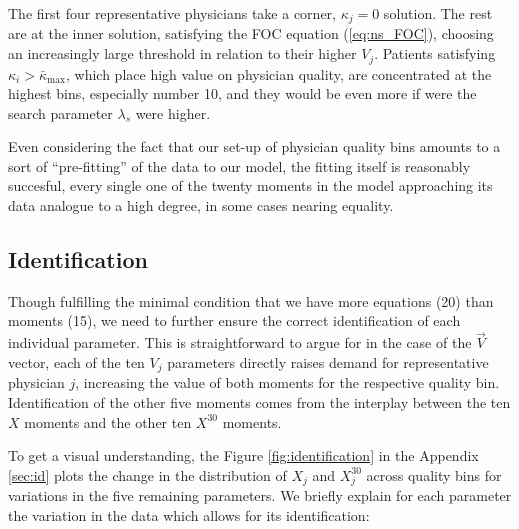 \documentclass[../main.tex]{subfiles}
\begin{document}
The first four representative physicians take a corner, $\kappa_j = 0$ solution. The rest are at the inner solution, satisfying the FOC equation (\ref{eq:ns_FOC}), choosing an increasingly large threshold in relation to their higher $V_j$. Patients satisfying $\kappa_i > \bar{\kappa}_{\max}$, which place high value on physician quality, are concentrated at the highest bins, especially number 10, and they would be even more if were the search parameter $\lambda_s$ were higher.

Even considering the fact that our set-up of physician quality bins amounts to a sort of ``pre-fitting'' of the data to our model, the fitting itself is reasonably succesful, every single one of the twenty moments in the model approaching its data analogue to a high degree, in some cases nearing equality.

\subsection{Identification}

Though fulfilling the minimal condition that we have more equations (20) than moments (15), we need to further ensure the correct identification of each individual parameter. This is straightforward to argue for in the case of the $\vec{V}$ vector, each of the ten $V_j$ parameters directly raises demand for representative physician $j$, increasing the value of both moments for the respective quality bin. Identification of the other five moments comes from the interplay between the ten $X$ moments and the other ten $X^{30}$ moments.

To get a visual understanding, the Figure \ref{fig:identification} in the Appendix \ref{sec:id} plots the change in the distribution of $X_j$ and $X_j^{30}$ across quality bins for variations in the five remaining parameters. We briefly explain for each parameter the variation in the data which allows for its identification:
\end{document}
